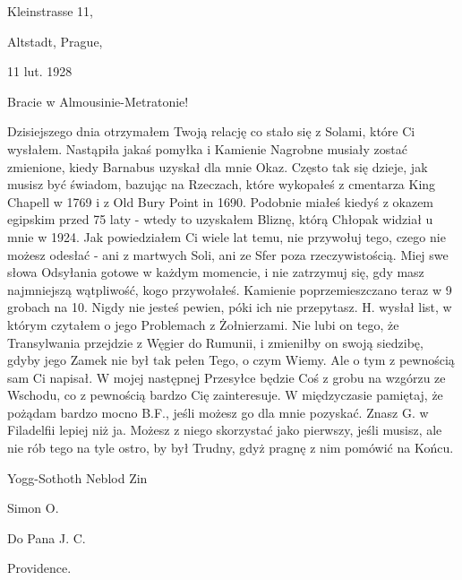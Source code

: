 \begin{displayquote}

\begin{flushright}
Kleinstrasse 11,

Altstadt, Prague,

11 lut. 1928
\end{flushright}

Bracie w Almousinie-Metratonie!

Dzisiejszego dnia otrzymałem Twoją relację co stało się z Solami, które Ci wysłałem. Nastąpiła jakaś pomyłka i Kamienie Nagrobne musiały zostać zmienione, kiedy Barnabus uzyskał dla mnie Okaz. Często tak się dzieje, jak musisz być świadom, bazując na Rzeczach, które wykopałeś z cmentarza King Chapell w 1769 i z Old Bury Point in 1690. Podobnie miałeś kiedyś z okazem egipskim przed 75 laty - wtedy to uzyskałem Bliznę, którą Chłopak widział u mnie w 1924. Jak powiedziałem Ci wiele lat temu, nie przywołuj tego, czego nie możesz odesłać - ani z martwych Soli, ani ze Sfer poza rzeczywistością. Miej swe słowa Odsyłania gotowe w każdym momencie, i nie zatrzymuj się, gdy masz najmniejszą wątpliwość, kogo przywołałeś. Kamienie poprzemieszczano teraz w 9 grobach na 10. Nigdy nie jesteś pewien, póki ich nie przepytasz. H. wysłał list, w którym czytałem o jego Problemach z Żołnierzami. Nie lubi on tego, że Transylwania przejdzie z Węgier do Rumunii, i zmieniłby on swoją siedzibę, gdyby jego Zamek nie był tak pełen Tego, o czym Wiemy. Ale o tym z pewnością sam Ci napisał. W mojej następnej Przesyłce będzie Coś z grobu na wzgórzu ze Wschodu, co z pewnością bardzo Cię zainteresuje. W międzyczasie pamiętaj, że pożądam bardzo mocno B.F., jeśli możesz go dla mnie pozyskać. Znasz G. w Filadelfii lepiej niż ja. Możesz z niego skorzystać jako pierwszy, jeśli musisz, ale nie rób tego na tyle ostro, by był Trudny, gdyż pragnę z nim pomówić na Końcu.

\begin{flushright}
Yogg-Sothoth Neblod Zin

Simon O.
\end{flushright}

Do Pana J. C.

Providence.

\end{displayquote}

